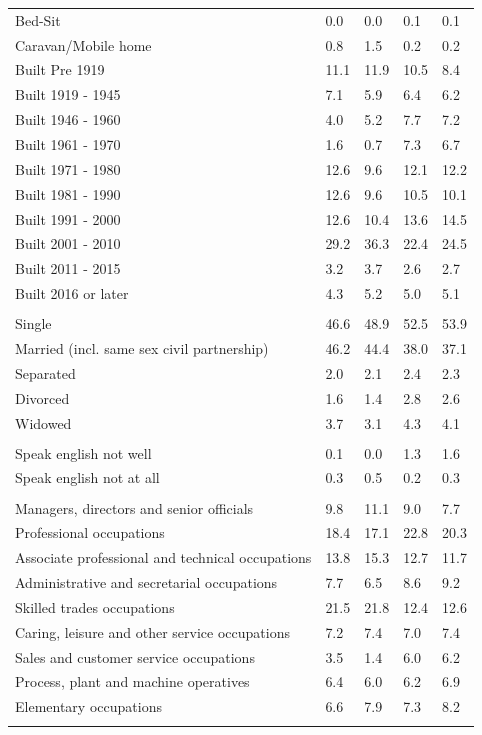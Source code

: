 \documentclass{article}
\begin{document}
\begin{table}[h]
\begin{tabular}{KTTTT}
Bed-Sit & 0.0& 0.0& 0.1& 0.1\\
Caravan/Mobile home & 0.8& 1.5& 0.2& 0.2\\
    \hline
Built Pre 1919 & 11.1& 11.9& 10.5&  8.4\\
Built 1919 - 1945 & 7.1& 5.9& 6.4& 6.2\\
Built  1946 - 1960 & 4.0& 5.2& 7.7& 7.2\\
Built  1961 - 1970 & 1.6& 0.7& 7.3& 6.7\\
Built  1971 - 1980 & 12.6&  9.6& 12.1& 12.2\\
Built  1981 - 1990 & 12.6&  9.6& 10.5& 10.1\\
Built  1991 - 2000 & 12.6& 10.4& 13.6& 14.5\\
Built  2001 - 2010 & 29.2& 36.3& 22.4& 24.5\\
Built  2011 - 2015 & 3.2& 3.7& 2.6& 2.7\\
Built  2016 or later & 4.3& 5.2& 5.0& 5.1\\
\hline
    \\
    \hline
Single & 46.6& 48.9& 52.5& 53.9\\
Married (incl. same sex civil partnership) & 46.2& 44.4& 38.0& 37.1\\
Separated  & 2.0& 2.1& 2.4& 2.3\\
Divorced  & 1.6& 1.4& 2.8& 2.6\\
Widowed & 3.7& 3.1& 4.3& 4.1\\
\hline
    \\ 
    \hline
Speak english not well & 0.1& 0.0& 1.3& 1.6\\
Speak english not at all & 0.3& 0.5& 0.2& 0.3\\
\hline
    \\
    \hline
Managers, directors and senior officials &  9.8& 11.1&  9.0&  7.7\\
Professional occupations & 18.4& 17.1& 22.8& 20.3\\
Associate professional and technical occupations & 13.8& 15.3& 12.7& 11.7\\
Administrative and secretarial occupations & 7.7& 6.5& 8.6& 9.2\\
Skilled trades occupations & 21.5& 21.8& 12.4& 12.6\\
Caring, leisure and other service occupations & 7.2& 7.4& 7.0& 7.4\\
Sales and customer service occupations & 3.5& 1.4& 6.0& 6.2\\
Process, plant and machine operatives & 6.4& 6.0& 6.2& 6.9\\
Elementary occupations & 6.6& 7.9& 7.3& 8.2\\
\hline
\end{tabular}
\end{table}
\end{document}
